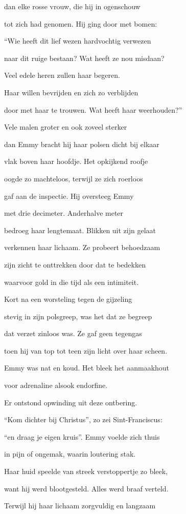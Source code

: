 dan elke rosse vrouw,
die hij in ogenschouw

tot zich had genomen.
Hij ging door met bomen:

“Wie heeft dit lief wezen
hardvochtig verwezen

naar dit ruige bestaan?
Wat heeft ze nou misdaan?

Veel edele heren
zullen haar begeren.

Haar willen bevrijden
en zich zo verblijden

door met haar te trouwen.
Wat heeft haar weerhouden?”

Vele malen groter
en ook zoveel sterker

dan Emmy bracht hij haar
polsen dicht bij elkaar

vlak boven haar hoofdje.
Het opkijkend roofje

oogde zo machteloos,
terwijl ze zich roerloos

gaf aan de inspectie.
Hij oversteeg Emmy

met drie decimeter.
Anderhalve meter

bedroeg haar lengtemaat.
Blikken uit zijn gelaat

verkennen haar lichaam.
Ze probeert behoedzaam

zijn zicht te onttrekken
door dat te bedekken

waarvoor gold in die tijd
als een intimiteit.

Kort na een worsteling
tegen de gijzeling

stevig in zijn polsgreep,
was het dat ze begreep

dat verzet zinloos was.
Ze gaf geen tegengas

toen hij van top tot teen
zijn licht over haar scheen.

Emmy was nat en koud.
Het bleek het aanmaakhout

voor adrenaline
alsook endorfine.

Er ontstond opwinding
uit deze ontbering.

“Kom dichter bij Christus”,
zo zei Sint-Franciscus:

“en draag je eigen kruis”.
Emmy voelde zich thuis

in pijn of ongemak,
waarin loutering stak.

Haar huid speelde van streek
verstoppertje zo bleek,

want hij werd blootgesteld.
Alles werd braaf verteld.

Terwijl hij haar lichaam
zorgvuldig en langzaam

